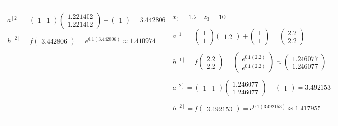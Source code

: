 \documentclass[11pt,a4paper]{article}
\begin{document}
\begin{flushleft}
\begin{tabularx}{1.09\textwidth}{X X}
  $ a^{[2]} = \begin{pmatrix} 1 & 1 \end{pmatrix} \begin{pmatrix} 1.221402 \\ 1.221402 \end{pmatrix} + \begin{pmatrix} 1 \end{pmatrix} = 3.442806 $ \par \vspace{1mm}
  $ h^{[2]} = f \begin{pmatrix} 3.442806 \end{pmatrix} = e^{0.1(3.442806)} \approx 1.410974 $ \par \vspace{1mm}
  & %
  $ \boxed{x_3 = 1.2} \quad z_3 = 10 $ \par \vspace{1mm}
  $ a^{[1]} = \begin{pmatrix} 1 \\ 1 \end{pmatrix} \begin{pmatrix} 1.2 \end{pmatrix} + \begin{pmatrix} 1 \\ 1 \end{pmatrix} = \begin{pmatrix} 2.2 \\ 2.2 \end{pmatrix} $ \par \vspace{1mm}
  $ h^{[1]} = f \begin{pmatrix} 2.2 \\ 2.2 \end{pmatrix} = \begin{pmatrix} e^{0.1(2.2)} \\ e^{0.1(2.2)} \end{pmatrix} \approx \begin{pmatrix} 1.246077 \\ 1.246077 \end{pmatrix} $ \par \vspace{1mm}
  $ a^{[2]} = \begin{pmatrix} 1 & 1 \end{pmatrix} \begin{pmatrix} 1.246077 \\ 1.246077 \end{pmatrix} + \begin{pmatrix} 1 \end{pmatrix} = 3.492153 $ \par \vspace{1mm}
  $ h^{[2]} = f \begin{pmatrix} 3.492153 \end{pmatrix} = e^{0.1(3.492153)} \approx 1.417955 $ \par \vspace{1mm}
\end{tabularx}


\end{flushleft}
\end{document}
